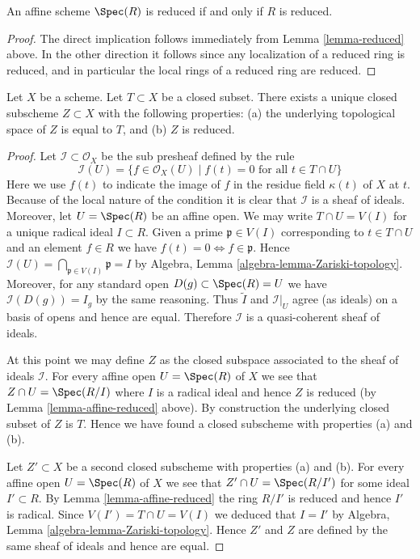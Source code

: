 \begin{lemma}
\label{lemma-affine-reduced}
An affine scheme $\Spec(R)$ is reduced
if and only if $R$ is reduced.
\end{lemma}

\begin{proof}
The direct implication follows immediately from
Lemma \ref{lemma-reduced} above.
In the other direction it follows since any localization of
a reduced ring is reduced, and in particular the local rings
of a reduced ring are reduced.
\end{proof}

\begin{lemma}
\label{lemma-reduced-closed-subscheme}
Let $X$ be a scheme. Let $T \subset X$ be a closed subset.
There exists a unique closed subscheme $Z \subset X$ with
the following properties: (a) the underlying topological
space of $Z$ is equal to $T$, and (b) $Z$ is reduced.
\end{lemma}

\begin{proof}
Let $\mathcal{I} \subset \mathcal{O}_X$ be the sub presheaf
defined by the rule
$$
\mathcal{I}(U) = \{f \in \mathcal{O}_X(U) \mid
f(t) = 0\text{ for all }t \in T\cap U\}
$$
Here we use $f(t)$ to indicate the image of
$f$ in the residue field $\kappa(t)$ of $X$ at $t$.
Because of the local nature of the condition it is
clear that $\mathcal{I}$ is a sheaf of ideals. Moreover,
let $U = \Spec(R)$ be an affine open.
We may write $T \cap U = V(I)$ for a unique radical
ideal $I \subset R$. Given a prime $\mathfrak p \in V(I)$
corresponding to $t \in T \cap U$ and an element $f \in R$ we have
$f(t) = 0 \Leftrightarrow f \in \mathfrak p$.
Hence $\mathcal{I}(U) = \bigcap_{\mathfrak p \in V(I)} \mathfrak p
= I$ by Algebra, Lemma \ref{algebra-lemma-Zariski-topology}.
Moreover, for any standard open $D(g) \subset \Spec(R) = U$
we have $\mathcal{I}(D(g)) = I_g$ by the same reasoning.
Thus $\widetilde I$ and $\mathcal{I}|_U$ agree (as ideals)
on a basis of opens and hence are equal. Therefore
$\mathcal{I}$ is a quasi-coherent sheaf of ideals.

\medskip\noindent
At this point we may define $Z$ as the closed subspace
associated to the sheaf of ideals $\mathcal{I}$. For every
affine open $U = \Spec(R)$ of $X$ we see that
$Z \cap U = \Spec(R/I)$ where $I$ is a radical ideal and
hence $Z$ is reduced (by Lemma \ref{lemma-affine-reduced} above).
By construction the underlying closed subset of $Z$ is $T$.
Hence we have found a closed subscheme with properties (a) and (b).

\medskip\noindent
Let $Z' \subset X$ be a second closed subscheme with properties (a) and (b).
For every affine open $U = \Spec(R)$ of $X$ we see that
$Z' \cap U = \Spec(R/I')$ for some ideal $I' \subset R$.
By Lemma \ref{lemma-affine-reduced} the ring $R/I'$ is
reduced and hence $I'$ is radical. Since $V(I') = T \cap U = V(I)$
we deduced that $I = I'$ by
Algebra, Lemma \ref{algebra-lemma-Zariski-topology}.
Hence $Z'$ and $Z$ are defined by the same sheaf of ideals
and hence are equal.
\end{proof}

